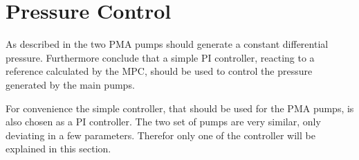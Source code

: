 \section{Pressure Control}
\label{pressure_control}

As described in  the two PMA pumps should generate a constant differential pressure. Furthermore  conclude that a simple PI controller, reacting to a reference calculated by the MPC, should be used to control the pressure generated by the main pumps. 

For convenience the simple controller, that should be used for the PMA pumps, is also chosen as a PI controller. The two set of pumps are very similar, only deviating in a few parameters. Therefor only one of the controller will be explained in this section.  

